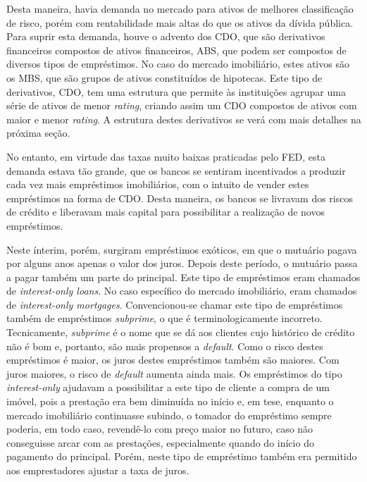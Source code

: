 \documentclass[
	12pt,				%
	oneside,			%
	a4paper,			%
	chapter=TITLE,		%
	section=TITLE,		%
	english,			%
	brazil				%
	]{abntex2}
\begin{document}
Desta maneira, havia demanda no mercado para ativos de melhores
classificação de risco, porém com rentabilidade mais altas do que os
ativos da dívida pública. Para suprir esta demanda, houve o advento dos
\gls{CDO}, que são derivativos financeiros compostos de ativos
financeiros, \gls{ABS}, que podem ser compostos de diversos tipos de
empréstimos. No caso do mercado imobiliário, estes ativos são os
\gls{MBS}, que são grupos de ativos constituídos de hipotecas. Este tipo
de derivativos, \gls{CDO}, tem uma estrutura que permite às instituições
agrupar uma série de ativos de menor \emph{rating}, criando assim um
\gls{CDO} compostos de ativos com maior e menor \emph{rating}. A
estrutura destes derivativos se verá com mais detalhes na próxima seção.

No entanto, em virtude das taxas muito baixas praticadas pelo \gls{FED},
esta demanda estava tão grande, que os bancos se sentiram incentivados a
produzir cada vez mais empréstimos imobiliários, com o intuito de vender
estes empréstimos na forma de \gls{CDO}. Desta maneira, os bancos se
livravam dos riscos de crédito e liberavam mais capital para
possibilitar a realização de novos empréstimos.

Neste ínterim, porém, surgiram empréstimos exóticos, em que o mutuário
pagava por alguns anos apenas o valor dos juros. Depois deste período, o
mutuário passa a pagar também um parte do principal. Este tipo de
empréstimos eram chamados de \emph{interest-only loans}. No caso
específico do mercado imobiliário, eram chamados de \emph{interest-only
mortgages}. Convencionou-se chamar este tipo de empréstimos também de
empréstimos \emph{subprime}, o que é terminologicamente incorreto.
Tecnicamente, \emph{subprime} é o nome que se dá aos clientes cujo
histórico de crédito não é bom e, portanto, são mais propensos a
\emph{default}. Como o risco destes empréstimos é maior, os juros destes
empréstimos também são maiores. Com juros maiores, o risco de
\emph{default} aumenta ainda mais. Os empréstimos do tipo
\emph{interest-only} ajudavam a possibilitar a este tipo de cliente a
compra de um imóvel, pois a prestação era bem diminuída no início e, em
tese, enquanto o mercado imobiliário continuasse subindo, o tomador do
empréstimo sempre poderia, em todo caso, revendê-lo com preço maior no
futuro, caso não conseguisse arcar com as prestações, especialmente
quando do início do pagamento do principal. Porém, neste tipo de
empréstimo também era permitido aos emprestadores ajustar a taxa de
juros.
\end{document}
